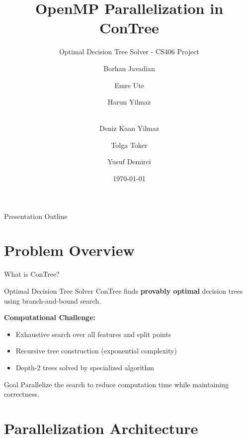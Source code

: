 \documentclass{beamer}
\title{OpenMP Parallelization in ConTree}
\subtitle{Optimal Decision Tree Solver - CS406 Project}
\author[]{Borhan Javadian \and Emre Ute \and Harun Yilmaz \and \\ Deniz Kaan Yilmaz \and Tolga Toker \and Yusuf Demirci}
\institute{Group 2}
\date{\today}
\begin{document}
\frame{\titlepage}

\begin{frame}{Presentation Outline}
\tableofcontents
\end{frame}

\section{Problem Overview}

\begin{frame}{What is ConTree?}
\begin{block}{Optimal Decision Tree Solver}
ConTree finds \textbf{provably optimal} decision trees using branch-and-bound search.
\end{block}

\vspace{0.5em}
\textbf{Computational Challenge:}
\begin{itemize}
    \item Exhaustive search over all features and split points
    \item Recursive tree construction (exponential complexity)
    \item Depth-2 trees solved by specialized algorithm
\end{itemize}

\vspace{0.5em}
\begin{alertblock}{Goal}
Parallelize the search to reduce computation time while maintaining correctness.
\end{alertblock}
\end{frame}

\section{Parallelization Architecture}
\end{document}
